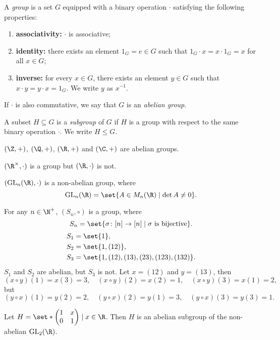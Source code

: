 \begin{definition*}[Group] \label{def:group}
    A \emph{group} is a set $G$ equipped with a binary operation $\cdot$
    satisfying the following properties:
    \begin{enumerate}[label=\small(G\arabic*)]
        \item \textbf{associativity:} $\cdot$ is associative;
        \item \textbf{identity:} there exists an element $1_G = e \in G$
            such that $1_G \cdot x = x \cdot 1_G = x$ for all $x \in G$;
        \item \textbf{inverse:} for every $x \in G$, there exists an element
            $y \in G$ such that $x \cdot y = y \cdot x = 1_G$.
            We write $y$ as $x^{-1}$.
    \end{enumerate}

    If $\cdot$ is also commutative, we say that $G$ is an
    \emph{abelian group}.

    A subset $H \subseteq G$ is a \emph{subgroup} of $G$ if $H$ is a group
    with respect to the same binary operation $\cdot$.
    We write $H \le G$.
\end{definition*}

\begin{examples}
    \item $(\Z, +)$, $(\Q, +)$, $(\R, +)$ and $(\C, +)$ are abelian groups.
    \item $(\R^\times, \cdot)$ is a group but $(\R, \cdot)$ is not.
    \item $(\GL_n(\R), \cdot)$ is a non-abelian group, where \[
        \GL_n(\R) = \set{A \in M_n(\R) \mid \det A \neq 0}.
    \]
    \item For any $n \in \N^+$, $(S_n, \circ)$ is a group, where \[
        S_n = \set{\sigma\colon [n] \to [n]
                \mid \sigma \text{ is bijective}}.
    \] \begin{align*}
        S_1 &= \set{1}, \\
        S_2 &= \set{1, (12)}, \\
        S_3 &= \set{1, (12), (13), (23), (123), (132)}.
    \end{align*}
    $S_1$ and $S_2$ are abelian, but $S_3$ is not.
    Let $x = (12)$ and $y = (13)$, then \[
        (x \circ y)(1) = x(3) = 3, \quad
        (x \circ y)(2) = x(2) = 1, \quad
        (x \circ y)(3) = x(1) = 2,
    \] but \[
        (y \circ x)(1) = y(2) = 2, \quad
        (y \circ x)(2) = y(1) = 3, \quad
        (y \circ x)(3) = y(3) = 1.
    \]
    \item Let $H = \set*{\begin{pmatrix}
        1 & x \\
        0 & 1
    \end{pmatrix} \mid x \in \R}$.
    Then $H$ is an abelian subgroup of the non-abelian $\GL_2(\R)$.
\end{examples}

